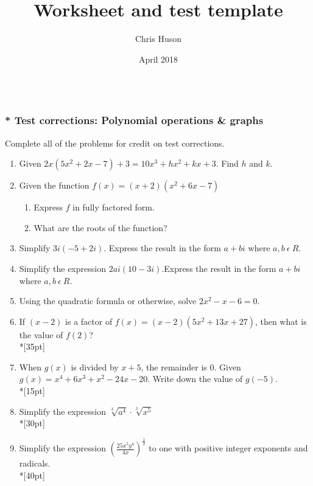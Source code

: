 \documentclass[12pt, oneside]{article}
\title{Worksheet and test template}
\author{Chris Huson}
\date{April 2018}
\begin{document}
\subsubsection*{\\* Test corrections: Polynomial operations \& graphs}
Complete all of the problems for credit on test corrections.

\begin{enumerate}

\item Given $2x(5x^2+2x-7)+3=10x^3+hx^2+kx+3$. Find $h$ and $k$.\\[120pt]

\item Given the function $f(x)=(x+2)(x^2+6x-7)$
\begin{enumerate}
    \item Express $f$ in fully factored form.\\[40pt]
    \item What are the roots of the function?\\[20pt]
\end{enumerate}

\item Simplify $3i(-5+2i)$. Express the result in the form $a+bi$ where $a,b \ \epsilon \ R$.\\[40pt]

\item Simplify the expression $2ai(10-3i)$.Express the result in the form $a+bi$ where $a,b \ \epsilon \ R$.\\[40pt]

\item Using the quadratic formula or otherwise, solve $2x^2-x-6=0$.

\item If $(x-2)$ is a factor of $f(x)=(x-2)(5x^2+13x+27)$, then what is the value of $f(2)$?\\*[35pt]

\item When $g(x)$ is divided by $x+5$, the remainder is 0. Given $g(x)=x^4+6x^3+x^2-24x-20$. Write down the value of $g(-5)$.\\*[15pt]

\item Simplify the expression $\sqrt[3]{a^4} \cdot \sqrt[3]{x^5}$ \\*[30pt]

\item Simplify the expression $\displaystyle \left( \frac{25x^{5}y^4}{4x} \right)^{\frac{1}{2}}$ to one with positive integer exponents and radicals.\\*[40pt]


\end{enumerate}
\end{document}
